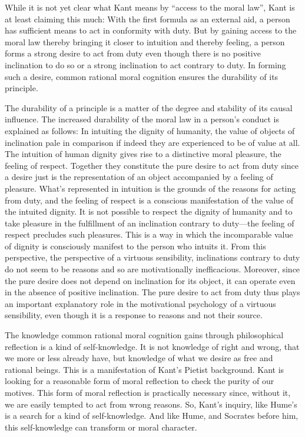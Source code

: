 While it is not yet clear what Kant means by ``access to the moral law'', Kant is at least claiming this much: With the first formula as an external aid, a person has sufficient means to act in conformity with duty. But by gaining access to the moral law thereby bringing it closer to intuition and thereby feeling, a person forms a strong desire to act from duty even though there is no positive inclination to do so or a strong inclination to act contrary to duty. In forming such a desire, common rational moral cognition ensures the durability of its principle.

The durability of a principle is a matter of the degree and stability of its causal influence. The increased durability of the moral law in a person's conduct is explained as follows: In intuiting the dignity of humanity, the value of objects of inclination pale in comparison if indeed they are experienced to be of value at all. The intuition of human dignity gives rise to a distinctive moral pleasure, the feeling of respect. Together they constitute the pure desire to act from duty since a desire just is the representation of an object accompanied by a feeling of pleasure. What's represented in intuition is the grounds of the reasons for acting from duty, and the feeling of respect is a conscious manifestation of the value of the intuited dignity. It is not possible to respect the dignity of humanity and to take pleasure in the fulfillment of an inclination contrary to duty---the feeling of respect precludes such pleasures. This is a way in which the incomparable value of dignity is consciously manifest to the person who intuits it. From this perspective, the perspective of a virtuous sensibility, inclinations contrary to duty do not seem to be reasons and so are motivationally inefficacious. Moreover, since the pure desire does not depend on inclination for its object, it can operate even in the absence of positive inclination. The pure desire to act from duty thus plays an important explanatory role in the motivational psychology of a virtuous sensibility, even though it is a response to reasons and not their source.

The knowledge common rational moral cognition gains through philosophical reflection is a kind of self-knowledge. It is not knowledge of right and wrong, that we more or less already have, but knowledge of what we desire as free and rational beings. This is a manifestation of Kant's Pietist background. Kant is looking for a reasonable form of moral reflection to check the purity of our motives. This form of moral reflection is practically necessary since, without it, we are easily tempted to act from wrong reasons. So, Kant's inquiry, like Hume's is a search for a kind of self-knowledge. And like Hume, and Socrates before him, this self-knowledge can transform or moral character.

